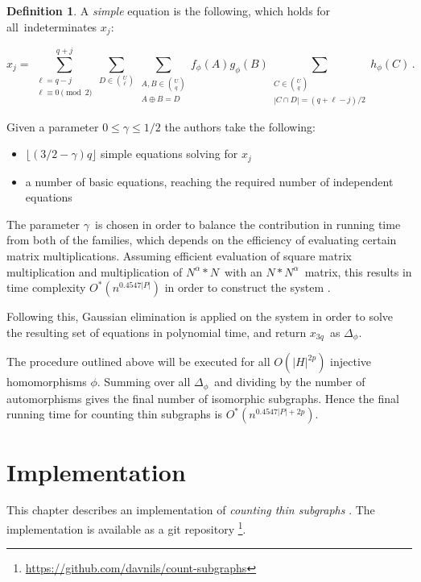 \documentclass[a4paper,11pt]{report}
\theoremstyle{plain}
\theoremstyle{definition}
\newtheorem{defn}[thm]{Definition} %
\begin{document}
\begin{defn}
A \emph{simple} equation is the following, which holds for all indeterminates $x_j$:

\begin{equation}
\label{eq:xj-direct}
x_j
=
\sum_{\substack{\ell=q-j\\\ell\equiv 0\!\!\!\!\!\pmod 2}}^{q+j}
\sum_{D\in\binom{U}{\ell}}
\sum_{\substack{A,B\in\binom{U}{q}\\A\oplus B=D}}
f_\phi(A)g_\phi(B)
\sum_{\substack{C\in\binom{U}{q}\\|C\cap D|=(q+\ell-j)/2}}h_\phi(C)\,.
\end{equation}

\end{defn}

Given a parameter $0 \leq \gamma \leq 1/2$ the authors take the following:
\begin{itemize}
\item $\lfloor (3/2 - \gamma)q \rfloor$ simple equations solving for $x_j$
\item a number of basic equations, reaching the required number of independent equations
\end{itemize}

The parameter $\gamma$ is chosen in order to balance the contribution in running time from both of the families, which depends on the efficiency of evaluating certain matrix multiplications.
Assuming efficient evaluation of square matrix multiplication and multiplication of $N^\alpha * N$ with an $N * N^\alpha$ matrix, this results in time complexity $O^*(n^{0.4547|P|})$ in order to construct the system \cite{BHKK13}.

Following this, Gaussian elimination is applied on the system in order to solve the resulting set of equations in polynomial time, and return $x_{3q}$ as $\Delta_\phi$.

The procedure outlined above will be executed for all $O(|H|^{2p})$ injective homomorphisms $\phi$.
Summing over all $\Delta_\phi$ and dividing by the number of automorphisms gives the final number of isomorphic subgraphs.
Hence the final running time for counting thin subgraphs is $O^*(n^{0.4547|P| + 2p})$.

\chapter{Implementation}
This chapter describes an implementation of \emph{counting thin subgraphs} \cite{BHKK13}.
The implementation is available as a git repository \footnote{\url{https://github.com/davnils/count-subgraphs}}.
\end{document}
